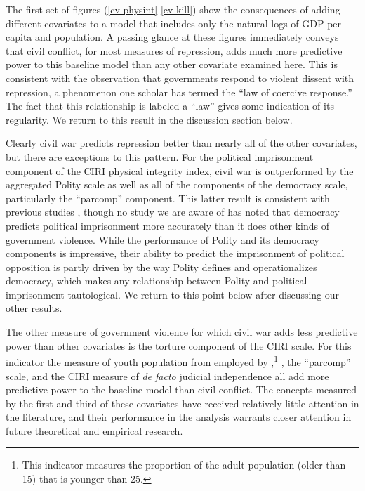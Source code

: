 \documentclass[12pt]{article}
\begin{document}
The first set of figures (\ref{cv-physint}-\ref{cv-kill}) show the consequences of adding different covariates to a model that includes only the natural logs of GDP per capita and population. A passing glance at these figures immediately conveys that civil conflict, for most measures of repression, adds much more predictive power to this baseline model than any other covariate examined here. This is consistent with the observation that governments respond to violent dissent with repression, a phenomenon one scholar \citep{Davenport2007AR} has termed the ``law of coercive response.'' The fact that this relationship is labeled a ``law'' gives some indication of its regularity. We return to this result in the discussion section below. 

Clearly civil war predicts repression better than nearly all of the other covariates, but there are exceptions to this pattern. For the political imprisonment component of the CIRI physical integrity index, civil war is outperformed by the aggregated Polity scale as well as all of the components of the democracy scale, particularly the ``parcomp'' component. This latter result is consistent with previous studies \citep{Keith2002PRQ,BDMetal2005}, though no study we are aware of has noted that democracy predicts political imprisonment more accurately than it does other kinds of government violence. While the performance of Polity and its democracy components is impressive, their ability to predict the imprisonment of political opposition is partly driven by the way Polity defines and operationalizes democracy, which makes any relationship between Polity and political imprisonment tautological. We return to this point below after discussing our other results.

The other measure of government violence for which civil war adds less predictive power than other covariates is the torture component of the CIRI scale. For this indicator the measure of youth population from \citet{Urdal2006} employed by \citet{NordaasDavenport2013},\footnote{This indicator measures the proportion of the adult population (older than 15) that is younger than 25.} , the ``parcomp'' scale, and the CIRI measure of {\it de facto} judicial independence all add more predictive power to the baseline model than civil conflict. The concepts measured by the first and third of these covariates have received relatively little attention in the literature, and their performance in the analysis warrants closer attention in future theoretical and empirical research. 
 
\end{document}
